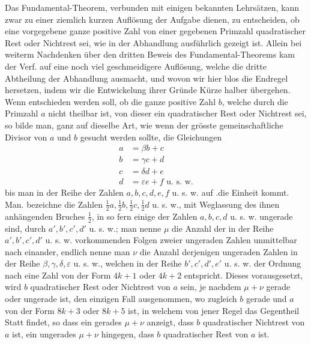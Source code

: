 %
Das Fundamental-Theorem, verbunden mit einigen bekannten Lehrsätzen, kann zwar zu einer ziemlich kurzen Auflösung der Aufgabe dienen, zu entscheiden, ob eine vorgegebene ganze positive Zahl von einer gegebenen Primzahl quadratischer Rest oder Nichtrest sei, wie in der Abhandlung ausführlich gezeigt ist. Allein bei weiterm Nachdenken über den dritten Beweis des Fundamental-Theorems kam der Verf. auf eine noch viel geschmeidigere Auflösung, welche die dritte Abtheilung der Abhandlung ausmacht, und wovon wir hier blos die Endregel hersetzen, indem wir die Entwickelung ihrer Gründe Kürze halber übergehen. Wenn entschieden werden soll, ob die ganze positive Zahl $b$, welche durch die Primzahl $a$ nicht theilbar ist, von dieser ein quadratischer Rest oder Nichtrest sei, so bilde man, ganz auf dieselbe Art, wie wenn der grösste gemeinschaftliche Divisor von $a$ und $b$ gesucht werden sollte, die Gleichungen
\[
\begin{aligned}
a&=\beta b+c\\
b&=\gamma c+d\\
c&=\delta d+e\\
d&=\varepsilon e+f\text{ u. s. w.}
\end{aligned}
\]
bis man in der Reihe der Zahlen $a,b,c,d,e,f$ u. s. w. auf .die Einheit kommt. Man. bezeichne die Zahlen $\frac12a,\frac12b,\frac12c,\frac12d$ u. s. w., mit Weglassung des ihnen anhängenden Bruches $\frac12$, in so fern einige der Zahlen $a,b,c,d$ u. s. w. ungerade sind, durch $a',b',c',d'$ u. s. w.; man nenne $\mu$ die Anzahl der in der Reihe $a',b',c',d'$ u. s. w. vorkommenden Folgen zweier ungeraden Zahlen unmittelbar nach einander, endlich nenne man $\nu$ die Anzahl derjenigen ungeraden Zahlen in der Reihe $\beta,\gamma,\delta,\varepsilon$ u. s. w., welchen in der Reihe $b',c',d',e'$ u. s. w. der Ordnung nach eine Zahl von der Form $4k+1$ oder $4k+2$ entspricht. Dieses vorausgesetzt, wird $b$ quadratischer Rest oder Nichtrest von $a$ sein, je nachdem $\mu+\nu$ gerade oder ungerade ist, den einzigen Fall ausgenommen, wo zugleich $b$ gerade und $a$ von der Form $8k+3$ oder $8k+5$ ist, in welchem von jener Regel das Gegentheil Statt findet, so dass ein gerades $\mu+\nu$ anzeigt, dass $b$ quadratischer Nichtrest von $a$ ist, ein ungerades $\mu+\nu$ hingegen, dass $b$ quadratischer Rest von $a$ ist.
